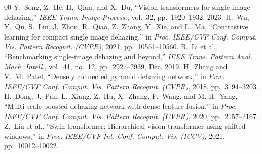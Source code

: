 \documentclass[journal]{IEEEtran}
\begin{document}
\begin{thebibliography}{00}
 Y.~Song, Z.~He, H.~Qian, and X.~Du, ``Vision transformers for single image dehazing,'' \emph{IEEE Trans. Image Process.}, vol.~32, pp.~1920--1932, 2023.
 H.~Wu, Y.~Qu, S.~Lin, J.~Zhou, R.~Qiao, Z.~Zhang, Y.~Xie, and L.~Ma, ``Contrastive learning for compact single image dehazing,'' in \emph{Proc. IEEE/CVF Conf. Comput. Vis. Pattern Recognit. (CVPR)}, 2021, pp.~10551--10560.
 B.~Li et al., ``Benchmarking single-image dehazing and beyond,'' \emph{IEEE Trans. Pattern Anal. Mach. Intell.}, vol.~41, no.~12, pp.~2927--2939, Dec. 2019.
 H.~Zhang and V.~M.~Patel, ``Densely connected pyramid dehazing network,'' in \emph{Proc. IEEE/CVF Conf. Comput. Vis. Pattern Recognit. (CVPR)}, 2018, pp.~3194--3203.
 H.~Dong, J.~Pan, L.~Xiang, Z.~Hu, X.~Zhang, F.~Wang, and M.-H.~Yang, ``Multi-scale boosted dehazing network with dense feature fusion,'' in \emph{Proc. IEEE/CVF Conf. Comput. Vis. Pattern Recognit. (CVPR)}, 2020, pp.~2157--2167.
 Z.~Liu et al., ``Swin transformer: Hierarchical vision transformer using shifted windows,'' in \emph{Proc. IEEE/CVF Int. Conf. Comput. Vis. (ICCV)}, 2021, pp.~10012--10022.
\end{thebibliography}
\end{document}
